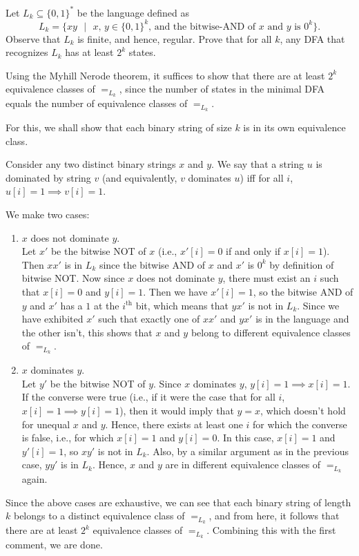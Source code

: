 \documentclass[answers]{exam}
\newcommand{\nl}{\vspace{0.2cm}\\}
\begin{document}
\begin{questions}
    \question[5]

    Let $L_k\subseteq\{0,1\}^*$ be the language defined as 
    \[
        L_k=\{xy\text{ }|\text{ }x\text{, }y\in\{0,1\}^k\text{, and the bitwise-AND of }x\text{ and }y\text{ is }0^k\}\text{.}
    \]
    Observe that $L_k$ is finite, and hence, regular. Prove that for all $k$, any DFA that recognizes $L_k$ has at least $2^k$ states.
    \begin{solution}
        Using the Myhill Nerode theorem, it suffices to show that there are at least $2^k$ equivalence classes of $=_{L_k}$, since the number of states in the minimal DFA equals the number of
        equivalence classes of $=_{L_k}$.

        For this, we shall show that each binary string of size $k$ is in its own equivalence class.

        Consider any two distinct binary strings $x$ and $y$. We say that a string $u$ is dominated by string $v$ (and equivalently, $v$ dominates $u$) iff for all $i$, $u[i] = 1 \implies v[i] = 1$.

        We make two cases:

        \begin{enumerate}
            \item $x$ does not dominate $y$.\nl
                Let $x'$ be the bitwise NOT of $x$ (i.e., $x'[i] = 0$ if and only if $x[i] = 1$). Then $xx'$ is in $L_k$ since the bitwise AND of $x$ and $x'$ is $0^k$ by definition of bitwise NOT.
                Now since $x$ does not dominate $y$, there must exist an $i$ such that $x[i] = 0$ and $y[i] = 1$. Then we have $x'[i] = 1$, so the bitwise AND of $y$ and $x'$ has a $1$ at the
                $i^\mathrm{th}$ bit, which means that $yx'$ is not in $L_k$.
                Since we have exhibited $x'$ such that exactly one of $xx'$ and $yx'$ is in the language and the other isn't, this shows that $x$ and $y$ belong to different equivalence classes of $=_{L_k}$.
            \item $x$ dominates $y$.\nl
                Let $y'$ be the bitwise NOT of $y$. Since $x$ dominates $y$, $y[i] = 1 \implies x[i] = 1$. If the converse were true (i.e., if it were the case that for all $i$, $x[i] = 1 \implies
                y[i] = 1$), then it would imply that $y = x$, which doesn't hold for unequal $x$ and $y$. Hence, there exists at least one $i$ for which the converse is false, i.e., for which $x[i] =
                1$ and $y[i] = 0$. In this case, $x[i] = 1$ and $y'[i] = 1$, so $xy'$ is not in $L_k$. Also, by a similar argument as in the previous case, $yy'$ is in $L_k$. Hence, $x$ and $y$ are in
                different equivalence classes of $=_{L_k}$ again.
        \end{enumerate}

        Since the above cases are exhaustive, we can see that each binary string of length $k$ belongs to a distinct equivalence class of $=_{L_k}$, and from here, it follows that there are at least
        $2^k$ equivalence classes of $=_{L_k}$. Combining this with the first comment, we are done.
    \end{solution}

\end{questions}
\end{document}
